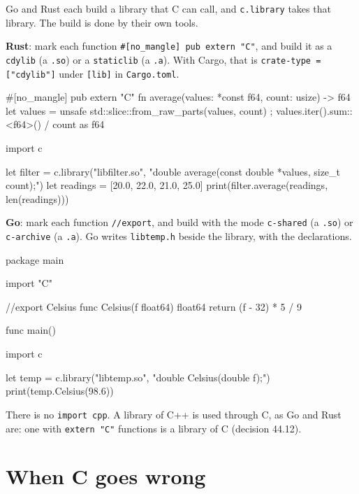 Go and Rust each build a library that C can call, and \verb|c.library|
takes that library. The build is done by their own tools.

\textbf{Rust}: mark each function \verb|#[no_mangle] pub extern "C"|,
and build it as a \verb|cdylib| (a \verb|.so|) or a \verb|staticlib|
(a \verb|.a|). With Cargo, that is \verb|crate-type = ["cdylib"]|
under \verb|[lib]| in \verb|Cargo.toml|.

\begin{zeno}[file=filter.rs, dir=rust, run=no]
#[no_mangle]
pub extern "C" fn average(values: *const f64, count: usize) -> f64 {
    let values = unsafe { std::slice::from_raw_parts(values, count) };
    values.iter().sum::<f64>() / count as f64
}
\end{zeno}

\begin{zeno}[file=average.zeno, dir=rust, cmd=rustc -O --crate-type cdylib filter.rs -o libfilter.so ;; zeno run {file}]
import c

let filter = c.library("libfilter.so", "double average(const double *values, size_t count);")
let readings = [20.0, 22.0, 21.0, 25.0]
print(filter.average(readings, len(readings)))
\end{zeno}

\textbf{Go}: mark each function \verb|//export|, and build with the
mode \verb|c-shared| (a \verb|.so|) or \verb|c-archive| (a \verb|.a|).
Go writes \verb|libtemp.h| beside the library, with the declarations.

\begin{zeno}[file=temp.go, dir=go, run=no]
package main

import "C"

//export Celsius
func Celsius(f float64) float64 { return (f - 32) * 5 / 9 }

func main() {}
\end{zeno}

\begin{zeno}[file=temp.zeno, dir=go, cmd=go build -buildmode=c-shared -o libtemp.so temp.go ;; zeno run {file}]
import c

let temp = c.library("libtemp.so", "double Celsius(double f);")
print(temp.Celsius(98.6))
\end{zeno}

There is no \verb|import cpp|. A library of C++ is used through C, as
Go and Rust are: one with \verb|extern "C"| functions is a library of
C (decision 44.12).

\section{When C goes wrong}

